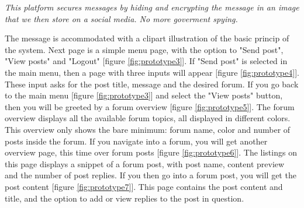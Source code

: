 \begin{mdframed}[linewidth=0pt,backgroundcolor=lightgray!20,innertopmargin = 0.4cm,innerbottommargin = 0.4cm]
\textit{This platform secures messages by hiding and encrypting the message in an image that we then store on a social media. No more goverment spying.}
\end{mdframed}
\noindent
The message is accommodated with a clipart illustration of the basic princip of the system. Next page is a simple menu page, with the option to "Send post", "View posts" and "Logout" [figure \ref{fig:prototype3}]. If "Send post" is selected in the main menu, then a page with three inputs will appear [figure \ref{fig:prototype4}]. These input asks for the post title, message and the desired forum. If you go back to the main menu [figure \ref{fig:prototype3}] and select the "View posts" button, then you will be greeted by a forum overview [figure \ref{fig:prototype5}]. The forum overview displays all the available forum topics, all displayed in different colors. This overview only shows the bare minimum: forum name, color and number of posts inside the forum. If you navigate into a forum, you will get another overview page, this time over forum posts [figure \ref{fig:prototype6}]. The listings on this page displays a snippet of a forum post, with post name, content preview and the number of post replies. If you then go into a forum post, you will get the post content [figure \ref{fig:prototype7}]. This page contains the post content and title, and the option to add or view replies to the post in question.